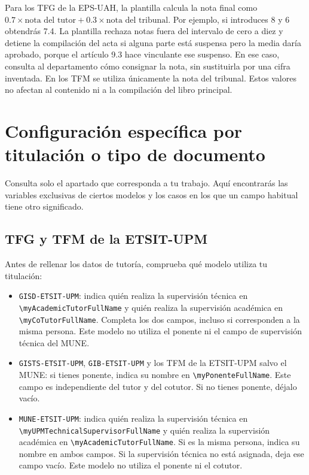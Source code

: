 Para los TFG de la EPS-UAH, la plantilla calcula la nota final como \(0.7 \times \mbox{nota del tutor} + 0.3 \times \mbox{nota del tribunal}\). Por ejemplo, si introduces 8 y 6 obtendrás 7.4. La plantilla rechaza notas fuera del intervalo de cero a diez y detiene la compilación del acta si alguna parte está suspensa pero la media daría aprobado, porque el artículo 9.3 hace vinculante ese suspenso. En ese caso, consulta al departamento cómo consignar la nota, sin sustituirla por una cifra inventada. En los TFM se utiliza únicamente la nota del tribunal. Estos valores no afectan al contenido ni a la compilación del libro principal.

\section{Configuración específica por titulación o tipo de documento}
\label{sec:configuracion-casos-especificos}

Consulta solo el apartado que corresponda a tu trabajo. Aquí encontrarás las variables exclusivas de ciertos modelos y los casos en los que un campo habitual tiene otro significado.

\subsection{TFG y TFM de la ETSIT-UPM}
\label{sec:configuracion-tfg-tfm-etsit-upm}

Antes de rellenar los datos de tutoría, comprueba qué modelo utiliza tu titulación:

\begin{itemize}
  \item \texttt{GISD-ETSIT-UPM}: indica quién realiza la supervisión técnica en \texttt{\textbackslash{}myAcademicTutorFullName} y quién realiza la supervisión académica en \texttt{\textbackslash{}myCoTutorFullName}. Completa los dos campos, incluso si corresponden a la misma persona. Este modelo no utiliza el ponente ni el campo de supervisión técnica del MUNE.
  \item \texttt{GISTS-ETSIT-UPM}, \texttt{GIB-ETSIT-UPM} y los TFM de la ETSIT-UPM salvo el MUNE: si tienes ponente, indica su nombre en \texttt{\textbackslash{}myPonenteFullName}. Este campo es independiente del tutor y del cotutor. Si no tienes ponente, déjalo vacío.
  \item \texttt{MUNE-ETSIT-UPM}: indica quién realiza la supervisión técnica en \texttt{\textbackslash{}myUPMTechnicalSupervisorFullName} y quién realiza la supervisión académica en \texttt{\textbackslash{}myAcademicTutorFullName}. Si es la misma persona, indica su nombre en ambos campos. Si la supervisión técnica no está asignada, deja ese campo vacío. Este modelo no utiliza el ponente ni el cotutor.
\end{itemize}

